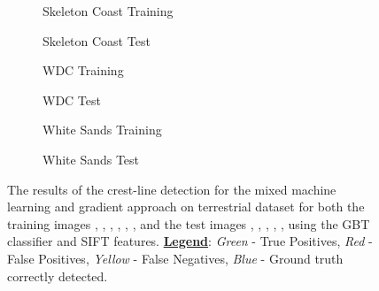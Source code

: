 \begin{figure}
	\ContinuedFloat
	\centering
	\begin{subfigure}{0.48\textwidth}
		\centering
		\caption{ Skeleton Coast Training }
		\label{fig:mixed_ml_grad_skeleton_coast_results}
	\end{subfigure}
	\begin{subfigure}{0.48\textwidth}
		\centering
		\caption{ Skeleton Coast Test }
		\label{fig:mixed_ml_grad_skeleton_coast_test_results}
	\end{subfigure}
	\begin{subfigure}{0.48\textwidth}
		\centering
		\caption{ WDC Training }
		\label{fig:mixed_ml_grad_wdc_results}
	\end{subfigure}
	\begin{subfigure}{0.48\textwidth}
		\centering
		\caption{ WDC Test }
		\label{fig:mixed_ml_grad_wdc_test_results}
	\end{subfigure}
	\begin{subfigure}{0.48\textwidth}
		\centering
		\caption{ White Sands Training }
		\label{fig:mixed_ml_grad_white_sands_results}
	\end{subfigure}
	\begin{subfigure}{0.48\textwidth}
		\centering
		\caption{ White Sands Test }
		\label{fig:mixed_ml_grad_white_sands_test_results}
	\end{subfigure}
	\caption{ The results of the crest-line detection for the mixed machine learning and gradient approach on terrestrial dataset for both the training images , , , , , , and the test images , , , , ,  using the GBT classifier and SIFT features. \underline{\textbf{Legend}}: \emph{Green} - True Positives, \emph{Red} - False Positives, \emph{Yellow} - False Negatives, \emph{Blue} - Ground truth correctly detected. }
	\label{fig:mixed_ml_grad_results}
\end{figure}

